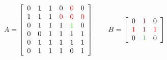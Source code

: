 \documentclass[varwidth=true]{standalone}
\newcommand{\tikzmark}[2]{\tikz[overlay,remember picture,baseline=(#1.base)] \node (#1) {#2};}
\begin{document}
\[
	A = \left[\begin{array}{*6{c}}
    0 & 1 & 1 & 0 & \color{red}{0} & 0 \\
    1 & 1 & 1 & \color{red}{0} & \color{red}{0} & \color{red}{0} \\
    0 & 1 & 1 & 1 & \color{green}{1} & 0 \\
    0 & 0 & 1 & 1 & 1 & 1 \\
    0 & 1 & 1 & 1 & 1 & 1  \\
    0 & 1 & 1 & 1 & 0 & 1 
  \end{array}\right]
  \qquad
  B  = \left[\begin{array}{*3{c}}
    \tikzmark{left}{0} & \color{red}{1} & 0\\
    \color{red}{1} & \color{red}{1} & \color{red}{1} \\
    0 & \color{green}{1} & \tikzmark{right}{0}
  \end{array}\right]
\]

\end{document}
